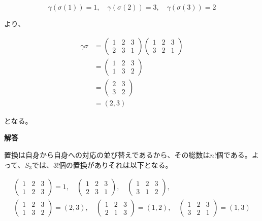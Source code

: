 \documentclass[dvipdfmx,autodetect-engine]{jsarticle}
\begin{document}
$$
\gamma(\sigma(1)) = 1, \quad \gamma(\sigma(2)) = 3, \quad \gamma(\sigma(3)) = 2
$$

より、

\begin{equation*}
\begin{split}
\gamma\sigma &= \begin{pmatrix}
1 & 2 & 3 \\
2 & 3 & 1
\end{pmatrix} \begin{pmatrix}
1 & 2 & 3 \\
3 & 2 & 1
\end{pmatrix}\\[1ex]
&= \begin{pmatrix}
1 & 2 & 3 \\
1 & 3 & 2
\end{pmatrix}\\[1ex]
&= \begin{pmatrix}
2 & 3 \\
3 & 2
\end{pmatrix}\\[1ex]
&= (2, 3)
\end{split}
\end{equation*}

となる。

\label{exercise:permutation1}

{\bf 解答}

置換は自身から自身への対応の並び替えであるから、その総数は$n!$個である。よって、$S_3$では、$3!$個の置換がありそれは以下となる。

\begin{eqnarray*}
\begin{pmatrix}
1 & 2 & 3 \\
1 & 2 & 3
\end{pmatrix} = 1, \quad \begin{pmatrix}
1 & 2 & 3 \\
2 & 3 & 1
\end{pmatrix}, \quad \begin{pmatrix}
1 & 2 & 3 \\
3 & 1 & 2
\end{pmatrix}, \\[1.5ex]
\begin{pmatrix}
1 & 2 & 3 \\
1 & 3 & 2
\end{pmatrix} = (2, 3), \quad 
\begin{pmatrix}
1 & 2 & 3 \\
2 & 1 & 3
\end{pmatrix} = (1, 2), \quad 
\begin{pmatrix}
1 & 2 & 3 \\
3 & 2 & 1
\end{pmatrix} = (1, 3)
\end{eqnarray*}
\end{document}

